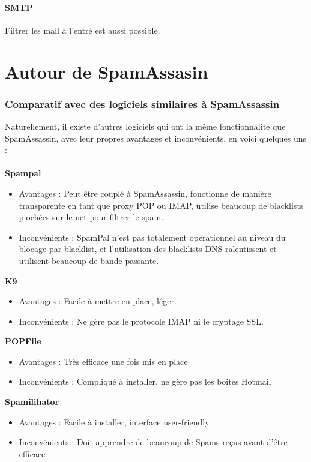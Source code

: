 \documentclass[a4paper,11pt]{article}
\begin{document}
\subsection{SMTP}

Filtrer les mail à l'entré est aussi possible. 
        

\part{Autour de SpamAssasin}

\section{Comparatif avec des logiciels similaires à SpamAssassin}
Naturellement, il existe d'autres logiciels qui ont la même fonctionnalité que SpamAssassin, avec leur propres avantages et inconvénients, en voici quelques uns : \\
\\
\textbf{Spampal}
\begin{itemize}
\item Avantages : Peut être couplé à SpamAssassin, fonctionne de manière transparente en tant que proxy POP ou IMAP, utilise beaucoup de blacklists piochées sur le net pour filtrer le spam.

\item Inconvénients : SpamPal n'est pas totalement opérationnel au niveau du blocage par blacklist, et l'utilisation des blacklists DNS ralentissent et utilisent beaucoup de bande passante.
\end{itemize}

\textbf{K9}
\begin{itemize}
\item Avantages : Facile à mettre en place, léger.
\item Inconvénients : Ne gère pas le protocole IMAP ni le cryptage SSL.
\end{itemize}

\textbf{POPFile}
\begin{itemize}
\item Avantages : Très efficace une fois mis en place
\item Inconvénients : Compliqué à installer, ne gère pas les boites Hotmail
\end{itemize}

\textbf{Spamilihator}
\begin{itemize}
\item Avantages : Facile à installer, interface user-friendly
\item Inconvénients : Doit apprendre de beaucoup de Spams reçus avant d'être efficace
\end{itemize}
\end{document}
